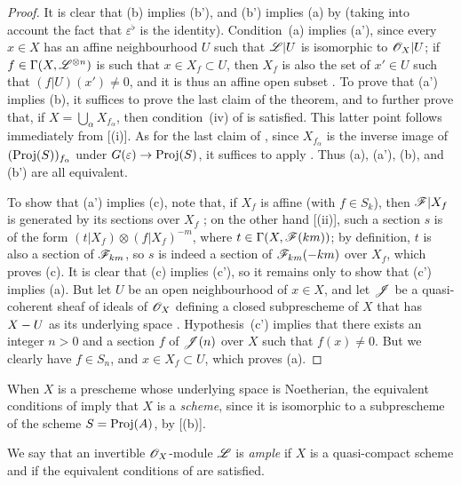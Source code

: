 \begin{proof}
  It is clear that (b) implies (b'), and (b') implies (a) by  (taking into account the fact that $\varepsilon^\flat$ is the identity).
  Condition~(a) implies (a'), since every $x\in X$ has an affine neighbourhood $U$ such that $\mathscr{L}|U$ is isomorphic to $\mathscr{O}_X|U$;
  if $f\in\Gamma(X,\mathscr{L}^{\otimes n})$ is such that $x\in X_f\subset U$, then $X_f$ is also the set of $x'\in U$ such that $(f|U)(x')\neq0$, and it is thus an affine open subset .
  To prove that (a') implies (b), it suffices to prove the last claim of the theorem, and to further prove that, if $X=\bigcup_\alpha X_{f_\alpha}$, then condition~(iv) of  is satisfied.
  This latter point follows immediately from [(i)].
  As for the last claim of , since $X_{f_\alpha}$ is the inverse image of $(\operatorname{Proj}(S))_{f_\alpha}$ under $G(\varepsilon)\to\Proj(S)$, it suffices to apply .
  Thus (a), (a'), (b), and (b') are all equivalent.

  To show that (a') implies (c), note that, if $X_f$ is affine (with $f\in S_k$), then $\mathscr{F}|X_f$ is generated by its sections over $X_f$ ;
  on the other hand [(ii)], such a section $s$ is of the form $(t|X_f)\otimes(f|X_f)^{-m}$, where $t\in\Gamma(X,\mathscr{F}(km))$;
  by definition, $t$ is also a section of $\mathscr{F}_{km}$, so $s$ is indeed a section of $\mathscr{F}_{km}(-km)$ over $X_f$, which proves (c).
  It is clear that (c) implies (c'), so it remains only to show that (c') implies (a).
  But let $U$ be an open neighbourhood of $x\in X$, and let $\mathscr{J}$ be a quasi-coherent sheaf of ideals of $\mathscr{O}_X$ defining a closed subprescheme of $X$ that has $X- U$ as its underlying space .
  Hypothesis~(c') implies that there exists an integer $n>0$ and a section $f$ of $\mathscr{J}(n)$ over $X$ such that $f(x)\neq0$.
  But we clearly have $f\in S_n$, and $x\in X_f\subset U$, which proves (a).
\end{proof}

When $X$ is a prescheme whose underlying space is Noetherian, the equivalent conditions of  imply that $X$ is a \emph{scheme}, since it is isomorphic to a subprescheme of the scheme $S=\operatorname{Proj}(A)$, by [(b)].

\begin{definition}[4.5.3]
\label{II.4.5.3}
We say that an invertible $\mathscr{O}_X$-module $\mathscr{L}$ is \emph{ample} if $X$ is a quasi-compact scheme and if the equivalent conditions of  are satisfied.
\end{definition}

